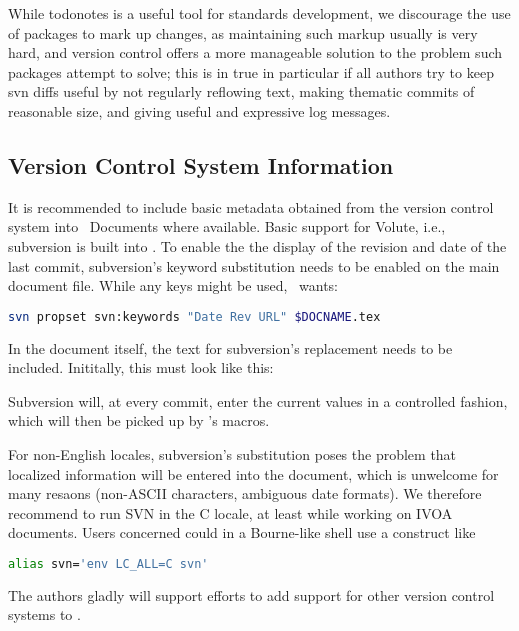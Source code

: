 \documentclass[11pt,a4paper]{ivoa}
\begin{document}
While todonotes is a useful tool for standards development, we
discourage the use of packages to mark up changes, as maintaining such
markup usually is very hard, and version control offers a more
manageable solution to the problem such packages attempt to solve; this
is in true in particular if all authors try to keep svn diffs useful by
not regularly reflowing text, making thematic commits of reasonable
size, and giving useful and expressive log messages.


\subsection{Version Control System Information}

It is recommended to include basic metadata obtained from the version
control system into \ivoatex~Documents where available.  Basic support
for Volute, i.e., subversion is built into \ivoatex.  To enable the
the display of the revision and date of the last commit, subversion's
keyword substitution needs to be enabled on the main document file.
While any keys might be used, \ivoatex~wants:

\begin{lstlisting}[language=sh]
svn propset svn:keywords "Date Rev URL" $DOCNAME.tex
\end{lstlisting}

In the document itself, the text for subversion's replacement needs to
be included.  Inititally, this must look like this:



Subversion will, at every commit, enter the current values in a
controlled fashion, which will then be picked up by \ivoatex's macros.

For non-English locales, subversion's substitution poses the problem that
localized information will be entered into the document, which is
unwelcome for many resaons (non-ASCII characters, ambiguous date
formats).  We therefore recommend to run SVN in the C
locale, at least while working on IVOA documents.  Users concerned
could in a Bourne-like shell use a construct like

\begin{lstlisting}[language=sh]
alias svn='env LC_ALL=C svn'
\end{lstlisting}

The authors gladly will support efforts to add support for other version
control systems to \ivoatex.
\end{document}
